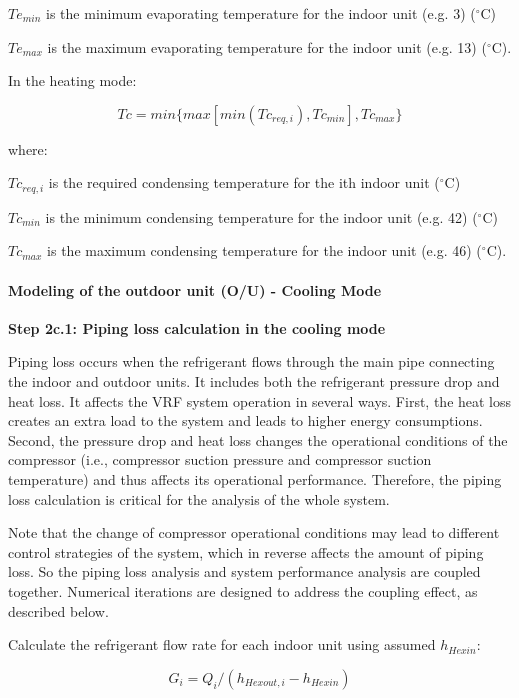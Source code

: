 $Te_{min}$ is the minimum evaporating temperature for the indoor unit (e.g. 3) (\(^{\circ}\)C)

$Te_{max}$ is the maximum evaporating temperature for the indoor unit (e.g. 13) (\(^{\circ}\)C).

In the heating mode:

\begin{equation}
  Tc = min \{ max[min(Tc_{req,i}),Tc_{min}],Tc_{max} \}
\end{equation}
 
where:

$Tc_{req,i}$ is the required condensing temperature for the ith indoor unit (\(^{\circ}\)C)

$Tc_{min}$ is the minimum condensing temperature for the indoor unit (e.g. 42) (\(^{\circ}\)C)

$Tc_{max}$ is the maximum condensing temperature for the indoor unit (e.g. 46) (\(^{\circ}\)C).

\paragraph{Modeling of the outdoor unit (O/U) - Cooling Mode}\label{modeling-of-the-outdoor-unit-ou-cooling-mode}

\textbf{Step 2c.1: Piping loss calculation in the cooling mode} 

Piping loss occurs when the refrigerant flows through the main pipe connecting the indoor and outdoor units. It includes both the refrigerant pressure drop and heat loss. It affects the VRF system operation in several ways. First, the heat loss creates an extra load to the system and leads to higher energy consumptions. Second, the pressure drop and heat loss changes the operational conditions of the compressor (i.e., compressor suction pressure and compressor suction temperature) and thus affects its operational performance. Therefore, the piping loss calculation is critical for the analysis of the whole system.

Note that the change of compressor operational conditions may lead to different control strategies of the system, which in reverse affects the amount of piping loss. So the piping loss analysis and system performance analysis are coupled together. Numerical iterations are designed to address the coupling effect, as described below.

Calculate the refrigerant flow rate for each indoor unit using assumed $h_{Hexin}$:

\begin{equation}
  G_i=Q_i/(h_{Hexout,i}-h_{Hexin})
\end{equation}

